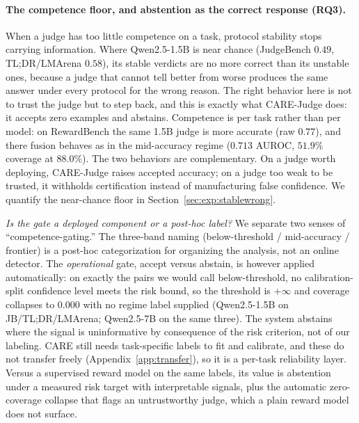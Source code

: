 

\paragraph{The competence floor, and abstention as the correct response (RQ3).}
When a judge has too little competence on a task, protocol stability stops carrying information. Where Qwen2.5-1.5B is near chance (JudgeBench $0.49$, TL;DR/LMArena $0.58$), its stable verdicts are no more correct than its unstable ones, because a judge that cannot tell better from worse produces the same answer under every protocol for the wrong reason. The right behavior here is not to trust the judge but to step back, and this is exactly what CARE-Judge does: it accepts zero examples and abstains. Competence is per task rather than per model: on RewardBench the same 1.5B judge is more accurate (raw $0.77$), and there fusion behaves as in the mid-accuracy regime ($0.713$ AUROC, $51.9\%$ coverage at $88.0\%$). The two behaviors are complementary. On a judge worth deploying, CARE-Judge raises accepted accuracy; on a judge too weak to be trusted, it withholds certification instead of manufacturing false confidence. We quantify the near-chance floor in Section~\ref{sec:exp:stablewrong}.

\emph{Is the gate a deployed component or a post-hoc label?} We separate two senses of ``competence-gating.'' The three-band naming (below-threshold / mid-accuracy / frontier) is a post-hoc categorization for organizing the analysis, not an online detector. The \emph{operational} gate, accept versus abstain, is however applied automatically: on exactly the pairs we would call below-threshold, no calibration-split confidence level meets the risk bound, so the threshold is $+\infty$ and coverage collapses to $0.000$ with no regime label supplied (Qwen2.5-1.5B on JB/TL;DR/LMArena; Qwen2.5-7B on the same three). The system abstains where the signal is uninformative by consequence of the risk criterion, not of our labeling. CARE still needs task-specific labels to fit and calibrate, and these do not transfer freely (Appendix~\ref{app:transfer}), so it is a per-task reliability layer. Versus a supervised reward model on the same labels, its value is abstention under a measured risk target with interpretable signals, plus the automatic zero-coverage collapse that flags an untrustworthy judge, which a plain reward model does not surface.

